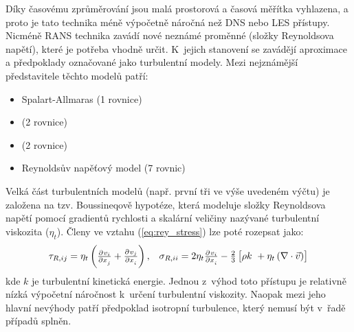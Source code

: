 Díky časovému zprůměrování jsou malá prostorová a časová měřítka vyhlazena, a proto je tato technika méně výpočetně náročná než DNS nebo LES přístupy. Nicméně RANS technika zavádí nové neznámé proměnné (složky Reynoldsova napětí), které je potřeba vhodně určit. K~jejich stanovení se zavádějí aproximace a předpoklady označované jako turbulentní modely. Mezi nejznámější představitele těchto modelů patří: 
\begin{itemize}[itemsep=0pt,parsep=0pt,partopsep=0pt,topsep=0pt]
  \item Spalart-Allmaras (1 rovnice) 
  \item \keps{} (2 rovnice) 
  \item \komg{} (2 rovnice) 
  \item Reynoldsův napěťový model (7 rovnic)
\end{itemize}
Velká část turbulentních modelů (např. první tři ve výše uvedeném výčtu) je založena na tzv. Boussineqově hypotéze, která modeluje složky Reynoldsova napětí pomocí gradientů rychlosti a skalární veličiny nazývané turbulentní viskozita ($\eta_{t}$). Členy ve vztahu (\ref{eq:rey_stress}) lze poté rozepsat jako: 
\begin{equation}
    \begin{array}{cc}
      \tau_{R,ij} = \eta_{t}\left( \pd{v_{i}}{x_{j}} + \pd{v_{j}}{x_{i}} \right), & \sigma_{R,ii} = 2\eta_{t}\pd{v_{i}}{x_{i}}  - \frac{2}{3} \left[ \rho k~+ \eta_{t} \left( \nabla  \cdot \vec{v} \right) \right]
      \end{array}
      \label{eq:rey_stress_bus}
\end{equation}
kde $k$ je turbulentní kinetická energie. Jednou z~výhod toto přístupu je relativně nízká výpočetní náročnost k~určení turbulentní viskozity. Naopak mezi jeho hlavní nevýhody patří předpoklad isotropní turbulence, který nemusí být v~řadě případů splněn.  

